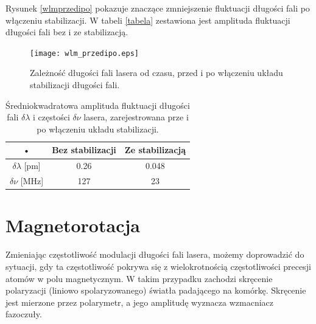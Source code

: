 \documentclass[a4paper,10pt,twoside]{report}
\begin{document}
Rysunek \ref{wlmprzedipo} pokazuje znaczące zmniejszenie fluktuacji długości fali po włączeniu stabilizacji. W tabeli \ref{tabela} zestawiona jest amplituda fluktuacji długości fali bez i ze stabilizacją. 



\begin{figure}[h!]
\centering
 \texttt{[image: wlm\_przedipo.eps]}
 \caption{Zależność długości fali lasera od czasu, przed i po włączeniu układu stabilizacji długości fali.}
 \label{fig:wlmprzedipo}
\end{figure}


\begin{table}[h!]
\centering
\begin{tabular}{|c|c|c|}
\hline 
• & Bez stabilizacji & Ze stabilizacją\\ 
\hline 
$\delta\lambda$ [pm]& 0.26 & 0.048 \\ 
\hline 
$\delta\nu$ [MHz]& 127 & 23 \\ 
\hline 
\end{tabular} 
\caption{Średniokwadratowa amplituda fluktuacji długości fali $\delta\lambda$ i częstości $\delta\nu$ lasera, zarejestrowana prze i po włączeniu układu stabilizacji. }
\end{table}

\section{Magnetorotacja}
\label{sec:magnetorotacja}


Zmieniając częstotliwość modulacji długości fali lasera, możemy doprowadzić do sytuacji, gdy ta częstotliwość pokrywa się z wielokrotnością częstotliwości precesji atomów w polu magnetycznym.
W takim przypadku zachodzi skręcenie polaryzacji (liniowo spolaryzowanego) światła padającego na komórkę. Skręcenie jest mierzone przez polarymetr, a jego amplitudę wyznacza wzmacniacz fazoczuły.
\end{document}
